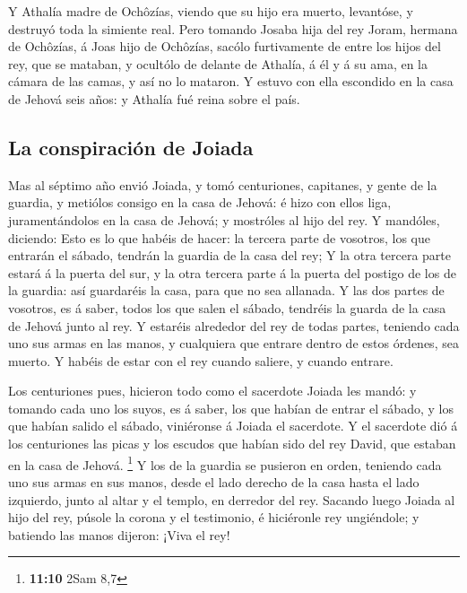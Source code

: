  Y Athalía madre de Ochôzías, viendo que su hijo era
muerto, levantóse, y destruyó toda la simiente real.  Pero
tomando Josaba hija del rey Joram, hermana de Ochôzías, á Joas hijo de
Ochôzías, sacólo furtivamente de entre los hijos del rey, que se
mataban, y ocultólo de delante de Athalía, á él y á su ama, en la cámara
de las camas, y así no lo mataron.  Y estuvo con ella
escondido en la casa de Jehová seis años: y Athalía fué reina sobre el
país.

\hypertarget{la-conspiraciuxf3n-de-joiada}{%
\subsection{La conspiración de
Joiada}\label{la-conspiraciuxf3n-de-joiada}}

 Mas al séptimo año envió Joiada, y tomó centuriones,
capitanes, y gente de la guardia, y metiólos consigo en la casa de
Jehová: é hizo con ellos liga, juramentándolos en la casa de Jehová; y
mostróles al hijo del rey.  Y mandóles, diciendo: Esto es
lo que habéis de hacer: la tercera parte de vosotros, los que entrarán
el sábado, tendrán la guardia de la casa del rey;  Y la
otra tercera parte estará á la puerta del sur, y la otra tercera parte á
la puerta del postigo de los de la guardia: así guardaréis la casa, para
que no sea allanada.  Y las dos partes de vosotros, es á
saber, todos los que salen el sábado, tendréis la guarda de la casa de
Jehová junto al rey.  Y estaréis alrededor del rey de
todas partes, teniendo cada uno sus armas en las manos, y cualquiera que
entrare dentro de estos órdenes, sea muerto. Y habéis de estar con el
rey cuando saliere, y cuando entrare.

 Los centuriones pues, hicieron todo como el sacerdote
Joiada les mandó: y tomando cada uno los suyos, es á saber, los que
habían de entrar el sábado, y los que habían salido el sábado,
viniéronse á Joiada el sacerdote.  Y el sacerdote dió á
los centuriones las picas y los escudos que habían sido del rey David,
que estaban en la casa de Jehová. \footnote{\textbf{11:10} 2Sam 8,7}
 Y los de la guardia se pusieron en orden, teniendo cada
uno sus armas en sus manos, desde el lado derecho de la casa hasta el
lado izquierdo, junto al altar y el templo, en derredor del rey.
 Sacando luego Joiada al hijo del rey, púsole la corona y
el testimonio, é hiciéronle rey ungiéndole; y batiendo las manos
dijeron: ¡Viva el rey!

